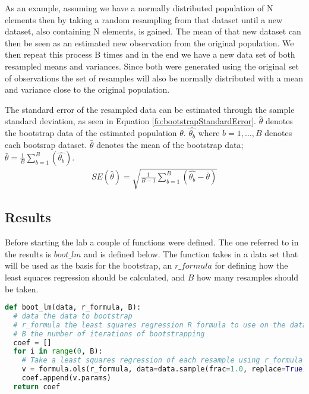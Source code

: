 As an example, assuming we have a normally distributed population of N elements then by taking a random resampling from that dataset until a new dataset, also containing N elements, is gained. The mean of that new dataset can then be seen as an estimated new observation from the original population. We then repeat this process B times and in the end we have a new data set of both resampled means and variances. Since both were generated using the original set of observations the set of resamples will also be normally distributed with a mean and variance close to the original population.
\fi

The standard error of the resampled data can be estimated through the sample standard deviation, as seen in Equation \ref{fo:bootstrapStandardError}. $\hat{\theta}$ denotes the bootstrap data of the estimated population $\theta$. $\hat{\theta_{b}}$ where $b=1,\dots,B$ denotes each bootsrap dataset. $\bar{\theta}$ denotes the mean of the bootstrap data; $\bar{\theta} = \frac{1}{B} \sum_{b=1}^{B}(\hat{\theta_{b}})$.
\begin{align}\label{fo:bootstrapStandardError}
	SE(\hat{\theta}) = \sqrt{\frac{1}{B-1} \sum_{b=1}^{B}(\hat{\theta_{b}} - \bar{\theta})} 
\end{align}


\subsection{Results}

Before starting the lab a couple of functions were defined. The one referred to in the results is $boot\_lm$ and is defined below. The function takes in a data set that will be used as the basis for the bootstrap, an $r\_formula$ for defining how the least squares regression should be calculated, and $B$ how many resamples should be taken.

\begin{lstlisting}[language=Python]
def boot_lm(data, r_formula, B):
  # data the data to bootstrap
  # r_formula the least squares regression R formula to use on the data
  # B the number of iterations of bootstrapping
  coef = []
  for i in range(0, B):
    # Take a least squares regression of each resample using r_formula
    v = formula.ols(r_formula, data=data.sample(frac=1.0, replace=True)).fit()
    coef.append(v.params)
  return coef
\end{lstlisting}

